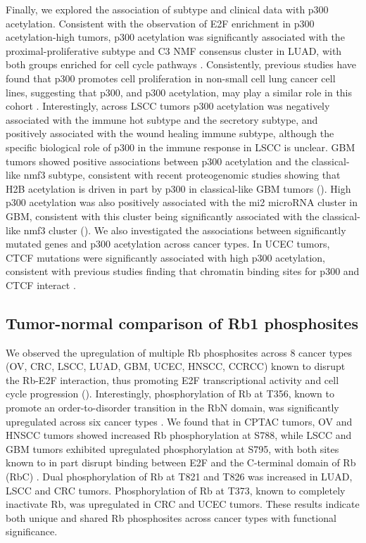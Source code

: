 Finally, we explored the association of subtype and clinical data with p300 acetylation. Consistent with the observation of E2F enrichment in p300 acetylation-high tumors, p300 acetylation was significantly associated with the proximal-proliferative subtype and C3 NMF consensus cluster in LUAD, with both groups enriched for cell cycle pathways \cite{gillettema_shiz:ProteogenomicCharacterization2020}. Consistently, previous studies have found that p300 promotes cell proliferation in non-small cell lung cancer cell lines, suggesting that p300, and p300 acetylation, may play a similar role in this cohort \cite{reng_zhaok:CTCFMediatedEnhancerPromoter2017}. Interestingly, across LSCC tumors p300 acetylation was negatively associated with the immune hot subtype and the secretory subtype, and positively associated with the wound healing immune subtype, although the specific biological role of p300 in the immune response in LSCC is unclear. GBM tumors showed positive associations between p300 acetylation and the classical-like nmf3 subtype, consistent with recent proteogenomic studies showing that H2B acetylation is driven in part by p300 in classical-like GBM tumors \cite{wanglb_cptac:GBM2021} (). High p300 acetylation was also positively associated with the mi2 microRNA cluster in GBM, consistent with this cluster being significantly associated with the classical-like nmf3 cluster \cite{wanglb_cptac:GBM2021} (). We also investigated the associations between significantly mutated genes and p300 acetylation across cancer types. In UCEC tumors, CTCF mutations were significantly associated with high p300 acetylation, consistent with previous studies finding that chromatin binding sites for p300 and CTCF interact \cite{houx_zhangl:P300Promotes2018}.


\subsection{Tumor-normal comparison of Rb1 phosphosites}
We observed the upregulation of multiple Rb phosphosites across 8 cancer types (OV, CRC, LSCC, LUAD, GBM, UCEC, HNSCC, CCRCC) known to disrupt the Rb-E2F interaction, thus promoting E2F transcriptional activity and cell cycle progression \cite{rubinsm_rubinsm:DecipheringRetinoblastoma2013} ().  Interestingly, phosphorylation of Rb at T356, known to promote an order-to-disorder transition in the RbN domain, was significantly upregulated across six cancer types \cite{rubinsm_rubinsm:DecipheringRetinoblastoma2013}. We found that in CPTAC tumors, OV and HNSCC tumors showed increased Rb phosphorylation at S788, while LSCC and GBM tumors exhibited upregulated phosphorylation at S795, with both sites known to in part disrupt binding between E2F and the C-terminal domain of Rb (RbC) \cite{rubinsm_pavletichnp:StructureRb2005}. Dual phosphorylation of Rb at T821 and T826 was increased in LUAD, LSCC and CRC tumors. Phosphorylation of Rb at T373, known to completely inactivate Rb, was upregulated in CRC and UCEC tumors. These results indicate both unique and shared Rb phosphosites across cancer types with functional significance.

